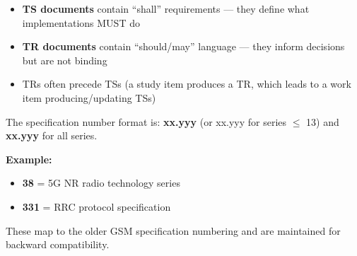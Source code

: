 \begin{itemize}
\tightlist
\item
  \textbf{TS documents} contain ``shall'' requirements — they define what implementations MUST do
\item
  \textbf{TR documents} contain ``should/\allowbreak{}may'' language — they inform decisions but are not binding
\item
  TRs often precede TSs (a study item produces a TR, which leads to a work item producing/\allowbreak{}updating TSs)
\end{itemize}



The specification number format is: \textbf{xx.yyy} (or xx.yyy for series \ensuremath{\le} 13) and \textbf{xx.yyy} for all series.


\textbf{Example:} 

\begin{itemize}
\tightlist
\item
  \textbf{38} = 5G NR radio technology series
\item
  \textbf{331} = RRC protocol specification
\end{itemize}


These map to the older GSM specification numbering and are maintained for backward compatibility.



